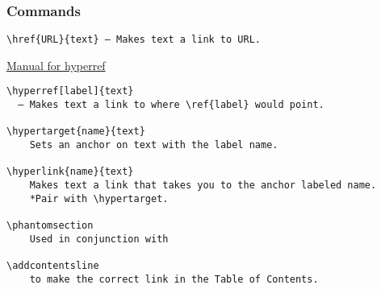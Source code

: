 \documentclass[class=article, crop=false, titlepage, twoside, multi={itemize, figure, verbatim}, float=false]{standalone}
\begin{document}
\subsubsection[Commands]{\Large Commands}
\begin{verbatim}
\href{URL}{text} — Makes text a link to URL.
\end{verbatim}
\href{../../../../../documentation/references/hyperrefmanual.pdf}{Manual for hyperref}

\begin{verbatim}
\hyperref[label]{text} 
  — Makes text a link to where \ref{label} would point.
  
\hypertarget{name}{text}
    Sets an anchor on text with the label name.
     
\hyperlink{name}{text} 
    Makes text a link that takes you to the anchor labeled name.     
    *Pair with \hypertarget.
 
\phantomsection
    Used in conjunction with

\addcontentsline 
    to make the correct link in the Table of Contents.
\end{verbatim}				
\end{document}

